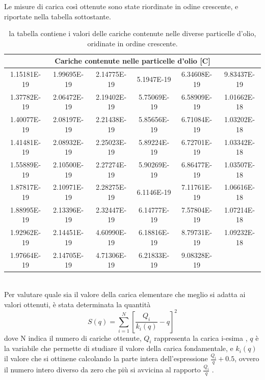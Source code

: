 \documentclass{article}
\begin{document}
Le misure di carica così ottenute sono state riordinate in odine crescente, e riportate nella tabella sottostante. \\ 
\begin{table}[h!]
    

\begin{center}
\begin{tabular}{ |c|c|c|c|c|c| } 
\hline
\multicolumn{6}{|c|}{Cariche contenute nelle particelle d'olio [C]} \\
 \hline
 
 1.15181E-19 &	1.99695E-19	& 2.14775E-19 &	5.1947E-19 &	6.34608E-19 &	9.83437E-19 \\
 \hline
1.37782E-19	& 2.06472E-19 & 2.19402E-19 &	5.75069E-19 &	6.58909E-19 &	1.01662E-18 \\
\hline
1.40077E-19	& 2.08197E-19 &	2.21438E-19 &	5.85656E-19 &	6.71084E-19 &	1.03202E-18 \\
\hline
1.41481E-19	& 2.08932E-19 &	2.25023E-19 &	5.89224E-19 &	6.72701E-19 &	1.03342E-18 \\
\hline
1.55889E-19	& 2.10500E-19 &	2.27274E-19 &	5.90269E-19 &	6.86477E-19 &	1.03507E-18 \\
\hline
1.87817E-19	& 2.10971E-19 &	2.28275E-19 &  6.1146E-19 &	7.11761E-19 &	1.06616E-18 \\
\hline
1.88995E-19	& 2.13396E-19 &	2.32447E-19 &	6.14777E-19 &	7.57804E-19 &	1.07214E-18 \\
\hline
1.92962E-19	& 2.14451E-19 &	4.60990E-19 &	6.18816E-19 &	8.79731E-19 &	1.09232E-18 \\
\hline
1.97664E-19	& 2.14705E-19 &	4.71306E-19 & 6.21833E-19 &	9.08328E-19	& \\

 
 \hline

\end{tabular}
 \label{cariche misurate}
\caption{la tabella contiene i valori delle cariche contenute nelle diverse particelle d'olio, oridinate in ordine crescente.}
\label{table:1}
\end{center}
\end{table} \\
Per valutare quale sia il valore della carica elementare che meglio si adatta ai valori ottenuti, è stata determinata la quantità
\begin{equation}
    S(q)=\sum_{i=1}^{N}[\frac{Q_i}{k_i(q)}-q]^2
    \label{S(q)}
\end{equation}
dove N indica il numero di cariche ottenute, $Q_i$ rappresenta la carica i-esima , $q$ è la variabile che permette di studiare il valore della carica fondamentale, e $k_i(q)$ il valore che si ottinene calcolando la parte intera dell'espressione $\frac{Q_i}{q}+0.5$, ovvero il numero intero diverso da zero che più si avvicina al rapporto $\frac{Q_i}{q}$ .
\end{document}
